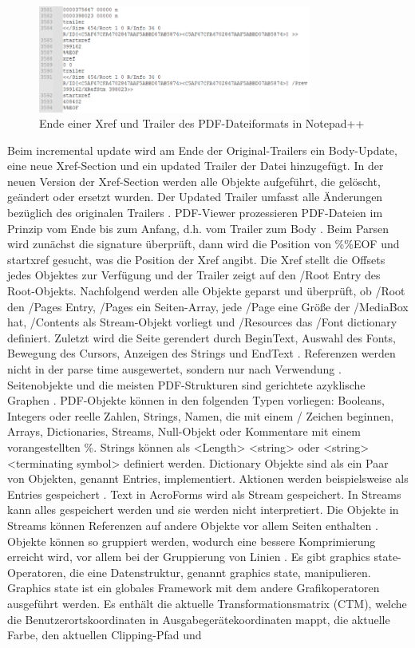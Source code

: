 \begin{figure}[!htb]
	\centering
	\includegraphics[width=0.8\textwidth]{"images/pdf_trailer2-notepad.png"}
	\caption{Ende einer Xref und Trailer des PDF-Dateiformats in Notepad++}
	\label{fig:trailer2}
\end{figure}

Beim incremental update wird am Ende der Original-Trailers ein Body-Update, eine neue Xref-Section und ein updated Trailer der Datei hinzugefügt. In der neuen Version der Xref-Section werden alle Objekte aufgeführt, die gelöscht, geändert oder ersetzt wurden. Der Updated Trailer umfasst alle Änderungen bezüglich des originalen Trailers \cite{schneeberger}. PDF-Viewer prozessieren PDF-Dateien im Prinzip vom Ende bis zum Anfang, d.h. vom Trailer zum Body \cite{ccc-break-pdf}. Beim Parsen wird zunächst die signature überprüft, dann wird die Position von \%\%EOF und startxref gesucht, was die Position der Xref angibt. Die Xref stellt die Offsets jedes Objektes zur Verfügung und der Trailer zeigt auf den /Root Entry des Root-Objekts. Nachfolgend werden alle Objekte geparst und überprüft, ob /Root den /Pages Entry, /Pages ein Seiten-Array, jede /Page eine Größe der /MediaBox hat, /Contents als Stream-Objekt vorliegt und /Resources das /Font dictionary definiert. Zuletzt wird die Seite gerendert durch BeginText, Auswahl des Fonts, Bewegung des Cursors, Anzeigen des Strings und EndText \cite{ccc-pdf-secrets}. Referenzen werden nicht in der parse time ausgewertet, sondern nur nach Verwendung \cite{ccc-wtf-pdf}. Seitenobjekte und die meisten PDF-Strukturen sind gerichtete azyklische Graphen \cite{ccc-wtf-pdf}. PDF-Objekte können in den folgenden Typen vorliegen: Booleans, Integers oder reelle Zahlen, Strings, Namen, die mit einem / Zeichen beginnen, Arrays, Dictionaries, Streams, Null-Objekt oder Kommentare mit einem vorangestellten \%. Strings können als <Length> <string> oder <string> <terminating symbol> definiert werden. Dictionary Objekte sind als ein Paar von Objekten, genannt Entries, implementiert. Aktionen werden beispielsweise als Entries gespeichert \cite{ccc-badpdf}. Text in AcroForms wird als Stream gespeichert. In Streams kann alles gespeichert werden und sie werden nicht interpretiert. Die Objekte in Streams können Referenzen auf andere Objekte vor allem Seiten enthalten \cite{ccc-break-pdf}. Objekte können so gruppiert werden, wodurch eine bessere Komprimierung erreicht wird, vor allem bei der Gruppierung von Linien \cite{schneeberger}. Es gibt graphics state-Operatoren, die eine Datenstruktur, genannt graphics state, manipulieren. Graphics state ist ein globales Framework mit dem andere Grafikoperatoren ausgeführt werden. Es enthält die aktuelle Transformationsmatrix (CTM), welche die Benutzerortskoordinaten in Ausgabegerätekoordinaten mappt, die aktuelle Farbe, den aktuellen Clipping-Pfad und 